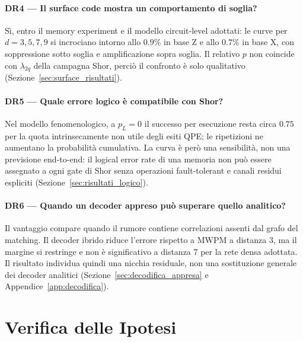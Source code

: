 \begin{onehalfspace}
\paragraph{DR4 --- Il surface code mostra un comportamento di soglia?}
Sì, entro il memory experiment e il modello circuit-level adottati: le curve
per $d=3,5,7,9$ si incrociano intorno allo $0.9\%$ in base Z e allo $0.7\%$ in
base X, con soppressione sotto soglia e amplificazione sopra soglia. Il relativo
$p$ non coincide con $\lambda_{2q}$ della campagna Shor, perciò il confronto è
solo qualitativo (Sezione~\ref{sec:surface_risultati}).

\paragraph{DR5 --- Quale errore logico è compatibile con Shor?}
Nel modello fenomenologico, a $p_L=0$ il successo per esecuzione resta circa
$0.75$ per la quota intrinsecamente non utile degli esiti QPE; le ripetizioni ne
aumentano la probabilità cumulativa. La curva è però una sensibilità, non una
previsione end-to-end: il logical error rate di una memoria non può essere
assegnato a ogni gate di Shor senza operazioni fault-tolerant e canali residui
espliciti (Sezione~\ref{sec:risultati_logico}).

\paragraph{DR6 --- Quando un decoder appreso può superare quello analitico?}
Il vantaggio compare quando il rumore contiene correlazioni assenti dal grafo
del matching. Il decoder ibrido riduce l'errore rispetto a \ac{MWPM} a distanza
3, ma il margine si restringe e non è significativo a distanza 7 per la rete
densa adottata. Il risultato individua quindi una nicchia residuale, non una
sostituzione generale dei decoder analitici (Sezione~\ref{sec:decodifica_appresa}
e Appendice~\ref{app:decodifica}).

\section{Verifica delle Ipotesi}
\label{sec:verifica_ipotesi}


\end{onehalfspace}
